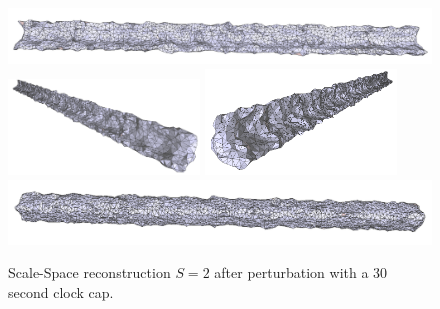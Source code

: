 \documentclass[12pt]{drexelthesis}
\begin{document}
\begin{figure}[!ht]
	
	\centering
		\includegraphics[width=5in]{simulated-lab-scan/2cmnoise/optimizedNeat/scalespace2perturb00.png}
		\includegraphics[width=2in]{simulated-lab-scan/2cmnoise/optimizedNeat/scalespace2perturb01.png}
		\includegraphics[width=2in]{simulated-lab-scan/2cmnoise/optimizedNeat/scalespace2perturb02.png}
		\includegraphics[width=5in]{simulated-lab-scan/2cmnoise/optimizedNeat/scalespace2perturb03.png}
		\caption[Scale-Space reconstruction $S = 2$ after perturbation with a 30 second clock cap]{\centering Scale-Space reconstruction $S = 2$ after perturbation with a 30 second clock cap.}
	\label{2cmnoise:scalespace2perturb}
\end{figure}
\end{document}

